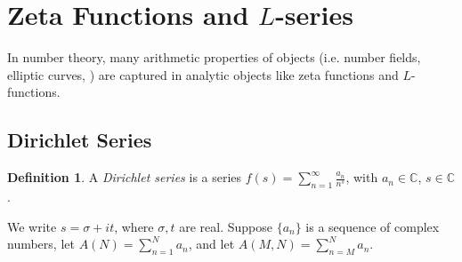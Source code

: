\documentclass[11pt]{article}
\theoremstyle{definition}
\newtheorem{definition}{Definition}[section]
\theoremstyle{plain}
\theoremstyle{remark}
\newcommand{\CC}{\mathbb{C}}
\begin{document}
\section{Zeta Functions and \texorpdfstring{$L$}{L}-series}
In number theory, many arithmetic properties of objects (i.e. number fields, elliptic curves, \textellipsis) are captured in analytic objects like zeta functions and $L$-functions.

\subsection{Dirichlet Series}

\begin{definition}\label{def:5_1}
    A \emph{Dirichlet series} is a series $f(s) = \sum_{n=1}^\infty \frac{a_n}{n^s}$, with $a_n \in \CC$, $s \in \CC$.
\end{definition}

We write $s = \sigma + i t$, where $\sigma, t$ are real. Suppose $\{a_n\}$ is a sequence of complex numbers, let $A(N) = \sum_{n=1}^N a_n$, and let $A(M, N) = \sum_{n=M}^N a_n$.
\end{document}
